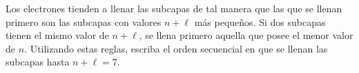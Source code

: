\item Los electrones tienden a llenar las subcapas de tal manera que las que se llenan primero son las subcapas con valores $n + \ell$ más pequeños. Si dos subcapas tienen el mismo valor de $n + \ell$, se llena primero aquella que posee el menor valor de $n$. Utilizando estas reglas, escriba el orden secuencial en que se llenan las subcapas hasta $n + \ell = 7$.